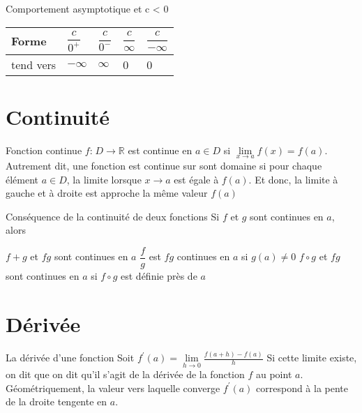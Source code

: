 \documentclass[2pt]{report}
\begin{document}
\begin{multicols*}{3}
\begin{Concept}{Comportement asymptotique et c < 0}{}
\end{Concept}
  \begin{table}[h]
    \begin{center}
      \renewcommand{\arraystretch}{1.5}
      \selectfont
      \footnotesize
      \begin{tabular}{|l|l|l|l|l|}
      \arrayrulecolor{blue}\hline
      \rowcolor{lightBlue}
      \textcolor{myb}{Forme} & \textcolor{myb}{$\dfrac{c}{0^{+}}$} & \textcolor{myb}{$\dfrac{c}{0^{-}}$}
                             & \textcolor{myb}{$\dfrac{c}{\infty}$} & \textcolor{myb}{$\dfrac{c}{-\infty}$}
      \\
      \hline
      \hline
      \arrayrulecolor{black}
      tend vers & $-\infty$ & $\infty$ & 0 & 0 
      \\
      \hline
      

  \end{tabular}
  \end{center}
  \end{table}
\section{Continuité}
\begin{Concept}{Fonction continue}{}
  $f\text{:} \; D \rightarrow \mathbb{R}$ est \textcolor{myb}{continue}   en $a \in D$ si $\lim\limits_{x\to a} f(x) = f(a)$. 
  Autrement dit, une fonction est continue sur sont domaine si pour chaque élément $a \in D$, la limite 
  lorsque $x \rightarrow a$ est égale à $f(a)$. Et donc, la limite à gauche et à droite est approche 
  la même valeur $f(a)$
\end{Concept}

\begin{Identite}{Conséquence de la continuité de deux fonctions}{}
    Si $f$ et $g$ sont continues en $a$, alors 
    \begin{enumerate}
       $f+g$ et $fg$ sont continues en $a$ 
       $\dfrac{f}{g}$ est $fg$ continues en $a$ si $g(a) \neq 0$
       $f \circ g$ et $fg$ sont continues en $a$ si $f \circ g$ 
      est définie près de $a$
    \end{enumerate}
\end{Identite}

\section{Dérivée}
\begin{Definitionx*}{La dérivée d'une fonction}{}
  Soit $f^{\prime}(a) = \lim\limits_{h\to 0}\frac{f(a + h) - f(a)}{h} $ Si cette limite existe, on dit que 
  on dit qu'il s'agit de \textcolor{myb}{la dérivée de la fonction}   $f$ au point $a$. Géométriquement, 
  la valeur vers laquelle converge $f^{\prime}(a)$ correspond à la pente de la droite tengente en $a$.
\end{Definitionx*}


\end{multicols*}
\end{document}
